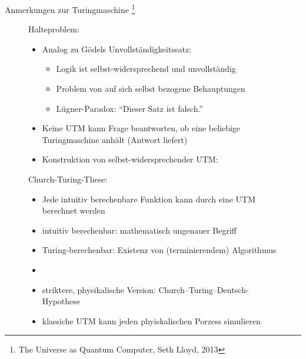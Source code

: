 \documentclass[aspectratio=1610, 9pt]{beamer}
\begin{document}
\begin{frame}{Anmerkungen zur Turingmaschine \footnote[8]{The Universe as Quantum Computer, Seth Lloyd, 2013}}
  \begin{figure}
    \begin{minipage}{0.55\textwidth}
      Halteproblem:
      \begin{itemize}
        \item Analog zu Gödels Unvollständigkeitssatz:
        \begin{itemize}
          \item Logik ist selbst-widersprechend und unvollständig
          \item Problem von auf sich selbst bezogene Behauptungen
          \item Lügner-Paradox: \enquote{Dieser Satz ist falsch.}
        \end{itemize}
        \item Keine UTM kann Frage beantworten, ob eine beliebige Turingmaschine anhält (Antwort liefert)
        \item Konstruktion von selbst-widersprechender UTM:
      \end{itemize}
      \begin{algorithm}[H]
      \end{algorithm}
    \end{minipage}
    \hfill
    \begin{minipage}{0.44\textwidth}
      Church-Turing-These:
      \begin{itemize}
        \item Jede intuitiv berechenbare Funktion kann durch eine UTM berechnet werden
        \item intuitiv berechenbar: mathematisch ungenauer Begriff
        \item Turing-berechenbar: Existenz von (terminierendem) Algorithmus
        \item[]
        \item striktere, physikalische Version: Church–Turing–Deutsch-Hypothese
        \item klassiche UTM kann jeden phyiskalischen Porzess simulieren
      \end{itemize}
    \end{minipage}
  \end{figure}
\end{frame}
\end{document}
